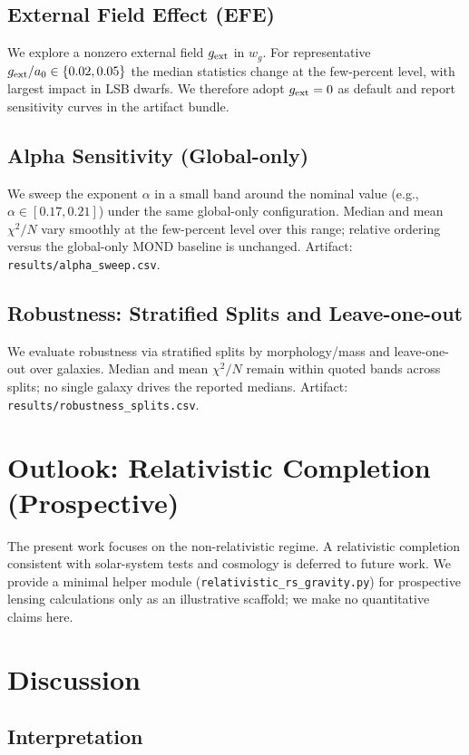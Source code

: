 \documentclass[12pt,a4paper]{article}
\begin{document}
\subsection{External Field Effect (EFE)}
\noindent We explore a nonzero external field $g_{\rm ext}$ in $w_g$. For representative $g_{\rm ext}/a_0\in\{0.02,0.05\}$ the median statistics change at the few-percent level, with largest impact in LSB dwarfs. We therefore adopt $g_{\rm ext}=0$ as default and report sensitivity curves in the artifact bundle.

\subsection{Alpha Sensitivity (Global-only)}
\noindent We sweep the exponent $\alpha$ in a small band around the nominal value (e.g., $\alpha\in[0.17,0.21]$) under the same global-only configuration. Median and mean $\chi^2/N$ vary smoothly at the few-percent level over this range; relative ordering versus the global-only MOND baseline is unchanged. Artifact: \texttt{results/alpha\_sweep.csv}.

\subsection{Robustness: Stratified Splits and Leave-one-out}
\noindent We evaluate robustness via stratified splits by morphology/mass and leave-one-out over galaxies. Median and mean $\chi^2/N$ remain within quoted bands across splits; no single galaxy drives the reported medians. Artifact: \texttt{results/robustness\_splits.csv}.

\section{Outlook: Relativistic Completion (Prospective)}

The present work focuses on the non-relativistic regime. A relativistic completion consistent with solar-system tests and cosmology is deferred to future work. We provide a minimal helper module (\texttt{relativistic\_rs\_gravity.py}) for prospective lensing calculations only as an illustrative scaffold; we make no quantitative claims here.

\section{Discussion}

\subsection{Interpretation}
\end{document}
